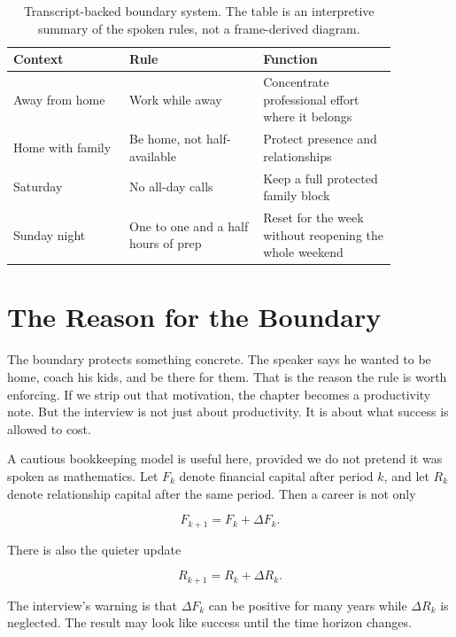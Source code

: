 \begin{table}
\centering
\begin{tabular}{|p{0.26\linewidth}|p{0.30\linewidth}|p{0.30\linewidth}|}
\hline
\textbf{Context} & \textbf{Rule} & \textbf{Function} \\
\hline
Away from home & Work while away & Concentrate professional effort where it belongs \\
\hline
Home with family & Be home, not half-available & Protect presence and relationships \\
\hline
Saturday & No all-day calls & Keep a full protected family block \\
\hline
Sunday night & One to one and a half hours of prep & Reset for the week without reopening the whole weekend \\
\hline
\end{tabular}
\caption{Transcript-backed boundary system. The table is an interpretive summary of the spoken rules, not a frame-derived diagram.}
\end{table}

\section{The Reason for the Boundary}

The boundary protects something concrete. The speaker says he wanted to be home, coach his kids, and be there for them. That is the reason the rule is worth enforcing. If we strip out that motivation, the chapter becomes a productivity note. But the interview is not just about productivity. It is about what success is allowed to cost.

A cautious bookkeeping model is useful here, provided we do not pretend it was spoken as mathematics. Let \(F_k\) denote financial capital after period \(k\), and let \(R_k\) denote relationship capital after the same period. Then a career is not only

\begin{equation}
F_{k+1}=F_k+\Delta F_k.
\end{equation}

There is also the quieter update

\begin{equation}
R_{k+1}=R_k+\Delta R_k.
\end{equation}

The interview's warning is that \(\Delta F_k\) can be positive for many years while \(\Delta R_k\) is neglected. The result may look like success until the time horizon changes.

